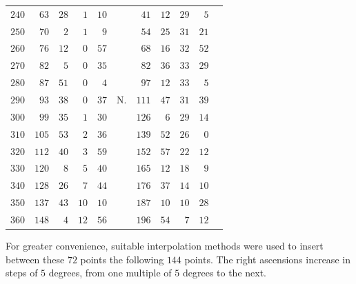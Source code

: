 \begin{center}
\begin{tabular}{r||rr|rrl||rr|rrl}
$240$&$63$&$28$&$1$&$10$&&$41$&$12$&$29$&$5$&\\[3pt]
$250$&$70$&$2$&$1$&$9$&&$54$&$25$&$31$&$21$&\\
$260$&$76$&$12$&$0$&$57$&&$68$&$16$&$32$&$52$&\\
$270$&$82$&$5$&$0$&$35$&&$82$&$36$&$33$&$29$&\\
$280$&$87$&$51$&$0$&$4$&&$97$&$12$&$33$&$5$&\\
$290$&$93$&$38$&$0$&$37$&N.&$111$&$47$&$31$&$39$&\\
$300$&$99$&$35$&$1$&$30$&&$126$&$6$&$29$&$14$&\\[3pt]
$310$&$105$&$53$&$2$&$36$&&$139$&$52$&$26$&$0$&\\
$320$&$112$&$40$&$3$&$59$&&$152$&$57$&$22$&$12$&\\
$330$&$120$&$8$&$5$&$40$&&$165$&$12$&$18$&$9$&\\
$340$&$128$&$26$&$7$&$44$&&$176$&$37$&$14$&$10$&\\
$350$&$137$&$43$&$10$&$10$&&$187$&$10$&$10$&$28$&\\
$360$&$148$&$4$&$12$&$56$&&$196$&$54$&$7$&$12$&
\end{tabular}
\endgroup
\end{center}
%
For greater convenience, suitable interpolation methods were used
to insert between these $72$ points the following $144$ points. The
right ascensions increase in steps of $5$ degrees, from one multiple
of $5$ degrees to the next.

